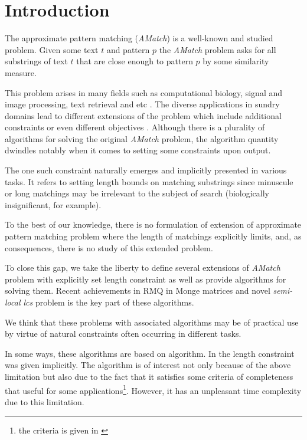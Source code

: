 \section{Introduction}

The approximate pattern matching (\emph{AMatch}) is a well-known and studied problem.
Given some text $t$ and pattern  $p$ the \emph{AMatch} problem asks for all substrings of text $t$ that are close enough to pattern $p$ by some similarity measure.

This problem arises in many fields such as computational biology, signal and image processing, text retrieval and etc \cite{}.
The diverse applications in sundry domains lead to different extensions of the problem which include additional constraints or even different objectives \cite{}.
Although there is a plurality of algorithms for solving the original \emph{AMatch} problem, the algorithm quantity dwindles notably when it comes to setting some constraints upon output.

The one such constraint naturally emerges and implicitly presented in various tasks\cite{TODO}. It refers to setting length bounds on matching substrings since minuscule or long matchings may be irrelevant to the subject of search (biologically insignificant, for example).

To the best of our knowledge, there is no formulation of extension of approximate pattern matching problem where the length of matchings explicitly limits, and, as consequences,  there is no study of this extended problem.

To close this gap, we take the liberty to define several extensions of \emph{AMatch} problem with explicitly set length constraint as well as provide algorithms for solving them. 
Recent achievements in RMQ in Monge matrices and novel \emph{semi-local lcs} problem is the key part of these algorithms.

We think that these problems with associated algorithms may be of practical use by virtue of natural constraints often occurring in different tasks.

In some ways, these algorithms are based on \cite{luciv2019interactive} algorithm.
In \cite{luciv2019interactive} the length constraint was given implicitly.
The algorithm is of interest not only because of the above limitation but also due to the fact that it satisfies some criteria of completeness that useful for some applications\footnote{the criteria is given in \cite{luciv2019interactive}}.
However, it has an unpleasant time complexity due to this limitation.

